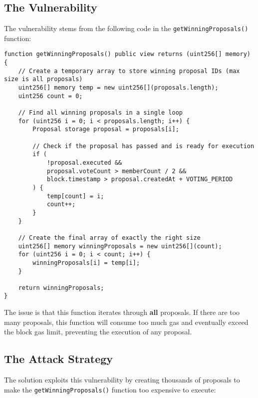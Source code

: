 \documentclass[12pt]{article}
\begin{document}
\subsection*{The Vulnerability}

The vulnerability stems from the following code in the \texttt{getWinningProposals()} function:

\noindent
\begin{minipage}{\textwidth}
\begin{lstlisting}[language=Solidity]
function getWinningProposals() public view returns (uint256[] memory) {
    // Create a temporary array to store winning proposal IDs (max size is all proposals)
    uint256[] memory temp = new uint256[](proposals.length);
    uint256 count = 0;

    // Find all winning proposals in a single loop
    for (uint256 i = 0; i < proposals.length; i++) {
        Proposal storage proposal = proposals[i];

        // Check if the proposal has passed and is ready for execution
        if (
            !proposal.executed &&
            proposal.voteCount > memberCount / 2 &&
            block.timestamp > proposal.createdAt + VOTING_PERIOD
        ) {
            temp[count] = i;
            count++;
        }
    }

    // Create the final array of exactly the right size
    uint256[] memory winningProposals = new uint256[](count);
    for (uint256 i = 0; i < count; i++) {
        winningProposals[i] = temp[i];
    }

    return winningProposals;
}
\end{lstlisting}
\end{minipage}

The issue is that this function iterates through \textbf{all} proposals. If there are too many proposals, this function will consume too much gas and eventually exceed the block gas limit, preventing the execution of any proposal.

\subsection*{The Attack Strategy}

The solution exploits this vulnerability by creating thousands of proposals to make the \texttt{getWinningProposals()} function too expensive to execute:
\end{document}
